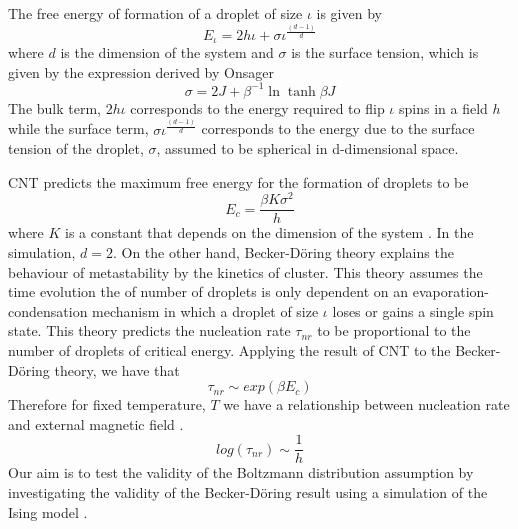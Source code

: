 \documentclass{article}
\begin{document}
\begin{multicols*}{2}
The free energy of formation of a droplet of size $\iota$ is given by
\begin{equation}\label{energy}
E_{\iota} = 2h\iota + \sigma\iota^{\frac{(d-1)}{d}}
\end{equation}
where $d$ is the dimension of the system and $\sigma$ is the surface tension, which is given by the expression derived by Onsager \cite{onsager}
\begin{equation}\label{surface tension}
\sigma = 2J + \beta^{-1}\ln\tanh\beta J
\end{equation}
The bulk term, $2h\iota$ corresponds to the energy required to flip $\iota$ spins in a field $h$ while the surface term, $\sigma\iota^{\frac{(d-1)}{d}}$ corresponds to the energy due to the surface tension of the droplet, $\sigma$, assumed to be spherical in d-dimensional space.

CNT predicts the maximum free energy for the formation of droplets to be
\begin{equation}\label{free energy}
E_{c} = \frac{\beta K\sigma ^{2}}{h}
\end{equation}
where $K$ is a constant that depends on the dimension of the system \cite{naskar_fields}. In the simulation, $d = 2$. On the other hand, Becker-Döring theory explains the behaviour of metastability by the kinetics of cluster. This theory assumes the time evolution the of number of droplets is only dependent on an evaporation-condensation mechanism in which a droplet of size $\iota$ loses or gains a single spin state. This theory predicts the nucleation rate $\tau_{nr}$ to be proportional to the number of droplets of critical energy. Applying the result of CNT to the Becker-Döring theory, we have that
\begin{equation}\label{nucleation rate}
\tau_{nr} \sim exp(\beta E_{c})
\end{equation}
Therefore for fixed temperature, $T$ we have a relationship between nucleation rate and external magnetic field \cite{klein}.
\begin{equation}\label{log rate-mag relation}
log(\tau_{nr}) \sim \frac{1}{h}
\end{equation}
 Our aim is to test the validity of the Boltzmann distribution assumption by investigating the validity of the Becker-Döring result using a simulation of the Ising model \cite{SSS}.


\end{multicols*}
\end{document}
